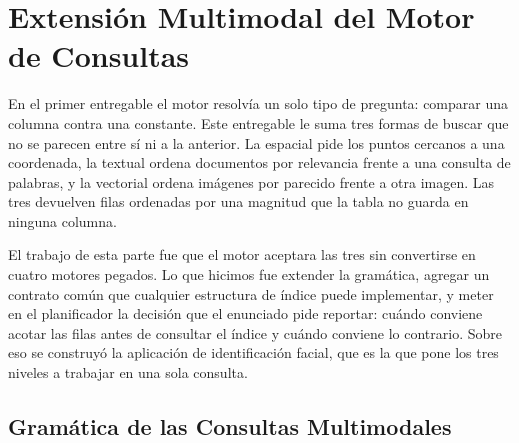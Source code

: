 %
%
%
%
%
%   
%

\section{Extensión Multimodal del Motor de Consultas}

En el primer entregable el motor resolvía un solo tipo de pregunta: comparar una
columna contra una constante. Este entregable le suma tres formas de buscar que
no se parecen entre sí ni a la anterior. La espacial pide los puntos cercanos a
una coordenada, la textual ordena documentos por relevancia frente a una
consulta de palabras, y la vectorial ordena imágenes por parecido frente a otra
imagen. Las tres devuelven filas ordenadas por una magnitud que la tabla no
guarda en ninguna columna.

El trabajo de esta parte fue que el motor aceptara las tres sin convertirse en
cuatro motores pegados. Lo que hicimos fue extender la gramática, agregar un
contrato común que cualquier estructura de índice puede implementar, y meter en
el planificador la decisión que el enunciado pide reportar: cuándo conviene
acotar las filas antes de consultar el índice y cuándo conviene lo contrario.
Sobre eso se construyó la aplicación de identificación facial, que es la que
pone los tres niveles a trabajar en una sola consulta.

\subsection{Gramática de las Consultas Multimodales}

